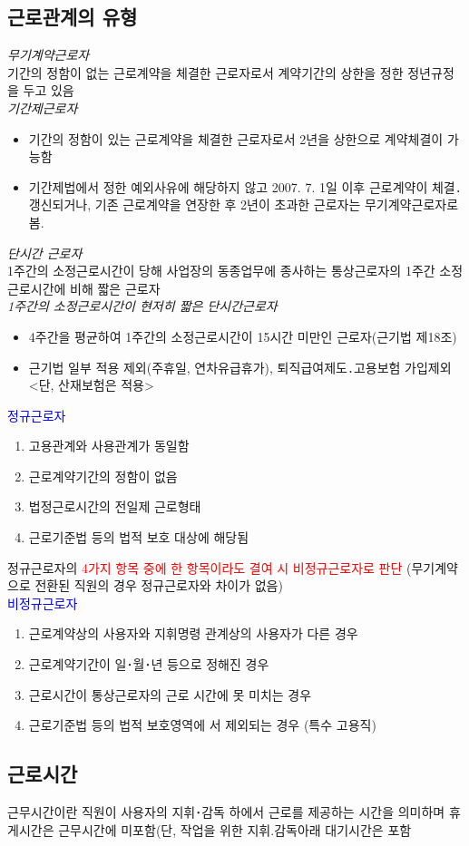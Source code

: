 \subsection{근로관계의 유형}
\emph{무기계약근로자}\\
기간의 정함이 없는 근로계약을 체결한 근로자로서 계약기간의 상한을 정한 정년규정을 두고 있음\\
\emph{기간제근로자}
\begin{itemize}\tightlist
\item 기간의 정함이 있는 근로계약을 체결한 근로자로서 2년을 상한으로 계약체결이 가능함
\item 기간제법에서 정한 예외사유에 해당하지 않고 2007. 7. 1일 이후 근로계약이 체결․갱신되거나, 
     기존 근로계약을 연장한 후 2년이 초과한 근로자는 무기계약근로자로 봄.
\end{itemize}
\emph{단시간 근로자}\\
1주간의 소정근로시간이 당해 사업장의 동종업무에 종사하는 통상근로자의 1주간 
   소정근로시간에 비해 짧은 근로자\\
\emph{1주간의 소정근로시간이 현저히 짧은 단시간근로자}
\begin{itemize}\tightlist
\item  4주간을 평균하여 1주간의 소정근로시간이 15시간 미만인 근로자(근기법 제18조)
\item 근기법 일부 적용 제외(주휴일, 연차유급휴가), 퇴직급여제도․고용보험 가입제외 
    <단, 산재보험은 적용>   
\end{itemize}
\textcolor{blue}{정규근로자}
\begin{enumerate}[❶]\tightlist
\item 고용관계와 사용관계가 동일함
\item 근로계약기간의 정함이 없음
\item 법정근로시간의 전일제 근로형태
\item 근로기준법 등의 법적 보호   대상에 해당됨   
\end{enumerate}
정규근로자의 \textcolor{red}{4가지 항목 중에 한 항목이라도 결여 시 비정규근로자로 판단}
       (무기계약으로 전환된 직원의 경우 정규근로자와 차이가 없음)   \\
\textcolor{blue}{비정규근로자}   
\begin{enumerate}[❶]\tightlist
\item 근로계약상의 사용자와 지휘명령  관계상의  사용자가 다른 경우
\item 근로계약기간이 일･월･년 등으로  정해진 경우
\item 근로시간이 통상근로자의 근로 시간에 못  미치는 경우
\item 근로기준법 등의 법적 보호영역에 서 제외되는  경우 (특수 고용직)  
\end{enumerate}
\subsection{근로시간}
\begin{mdframed}[linecolor=blue,middlelinewidth=2]
근무시간이란 직원이 사용자의 지휘･감독 하에서 근로를 제공하는 시간을 의미하며 휴게시간은 근무시간에 미포함(단, 작업을 위한 지휘.감독아래 대기시간은 포함
\end{mdframed}

